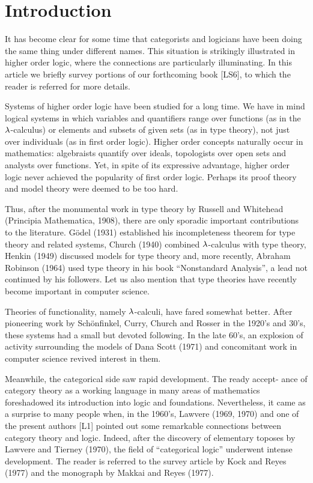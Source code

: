 \setcounter{section}{-1}


\maketitle

\section{Introduction}%
It has become clear for some time that categorists and logicians have been
doing the same thing under different names. This situation is strikingly
illustrated in higher order logic, where the connections are particularly
illuminating. In this article we briefly survey portions of our forthcoming
book [LS6], to which the reader is referred for more details.

Systems of higher order logic have been studied for a long time. We have
in mind logical systems in which variables and quantifiers range over functions
(as in the $\lambda$-calculus) or elements and subsets of given sets (as in type
theory), not just over individuals (as in first order logic). Higher order
concepts naturally occur in mathematics: algebraists quantify over ideals,
topologists over open sets and analysts over functions. Yet, in spite of its
expressive advantage, higher order logic never achieved the popularity of first
order logic. Perhaps its proof theory and model theory were deemed to be too
hard.

Thus, after the monumental work in type theory by Russell and Whitehead
(Principia Mathematica, 1908), there are only sporadic important contributions
to the literature. G\"{o}del (1931) established his incompleteness theorem for
type theory and related systems, Church (1940) combined $\lambda$-calculus with type
theory, Henkin (1949) discussed models for type theory and, more recently,
Abraham Robinson (1964) used type theory in his book ``Nonstandard Analysis'',
a lead not continued by his followers. Let us also mention that type theories
have recently become important in computer science.

Theories of functionality, namely $\lambda$-calculi, have fared somewhat better.
After pioneering work by Sch\"onfinkel, Curry, Church and Rosser in the 1920's
and 30's, these systems had a small but devoted following. In the late 60's,
an explosion of activity surrounding the models of Dana Scott (1971) and concomitant
work in computer science revived interest in them.

Meanwhile, the categorical side saw rapid development. The ready accept-
ance of category theory as a working language in many areas of mathematics
foreshadowed its introduction into logic and foundations. Nevertheless, it
came as a surprise to many people when, in the 1960's, Lawvere (1969, 1970) and
one of the present authors [L1] pointed out some remarkable connections between
category theory and logic. Indeed, after the discovery of elementary toposes
by Lawvere and Tierney (1970), the field of ``categorical logic'' underwent
intense development. The reader is referred to the survey article by Kock and
Reyes (1977) and the monograph by Makkai and Reyes (1977).

